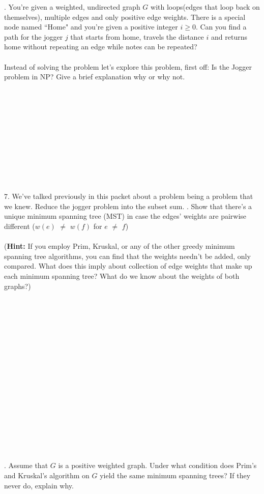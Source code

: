 \documentclass[12pt]{article}
\begin{document}
. You're given a weighted, undirected graph $G$ with loops(edges that loop back on themselves), 
 multiple edges and only positive edge weights. There is a special node named ``Home" and you're given a positive integer $i \geq 0$.
 Can you find a path for the jogger $j$ that starts from home, travels the distance $i$ and returns home without repeating an edge while notes can be repeated?
 \\\\Instead of solving the problem let's explore this problem, first off: Is the Jogger problem in NP? Give a brief explanation why or why not.\\\\\\\\\\\\\\\\\\\\\\\\
 7. We've talked previously in this packet about a problem being a problem that we knew. Reduce the jogger problem into the subset sum.
\newpage
{}. Show that there's a unique minimum spanning tree (MST) in case the edges' weights are pairwise different ($w(e)$ $\neq$ $w(f)$ for $e$ $\neq$ $f$)\\\\
(\textbf{Hint: }If you employ Prim, Kruskal, or any of the other greedy minimum spanning tree algorithms, you can find that the weights needn't be added, only compared. 
What does this imply about collection of edge weights that make up each minimum spanning tree? What do we know about the weights of both graphs?)\\\\\\\\\\\\\\\\\\\\\\\\\\\\\\\\\\\\
. Assume that $G$ is a positive weighted graph. 
Under what condition does Prim's and Kruskal's algorithm on $G$  
yield the same minimum spanning trees? If they never do, explain why.
\end{document}
